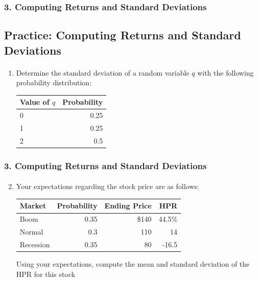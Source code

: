 \documentclass{beamer}
\begin{document}
\begin{practiceframe}[t]
  \frametitle{3. Computing Returns and Standard Deviations}
  \subsection{Practice: Computing Returns and Standard Deviations}
  \framesubtitle{}

    \begin{enumerate}
    \item Determine the standard deviation of a random variable $q$ with the following probability distribution:
      \begin{table}
        \begin{tabular}{lr}
          \toprule
          Value of $q$ & Probability \\
          \midrule
          0 & 0.25 \\
          1 & 0.25 \\
          2 & 0.5 \\
          \bottomrule
        \end{tabular}
      \end{table}
    \end{enumerate}
    
\end{practiceframe}

\begin{practiceframe}[t]
  \frametitle{3. Computing Returns and Standard Deviations}
  \framesubtitle{}

  \begin{enumerate}
  \setcounter{enumi}{1}
    \item Your expectations regarding the stock price are as follows:
      \begin{table}
        \begin{tabular}{lrrr}
          \toprule
          Market & Probability & Ending Price & HPR\\
          \midrule
          Boom & 0.35 & \$140 & 44.5\%\\
          Normal & 0.3 & 110 & 14\\
          Recession & 0.35 & 80 & -16.5\\
          \bottomrule
        \end{tabular}
      \end{table}
    Using your expectations, compute the mean and standard deviation of the HPR for this stock
  \end{enumerate}

\end{practiceframe}
\end{document}
